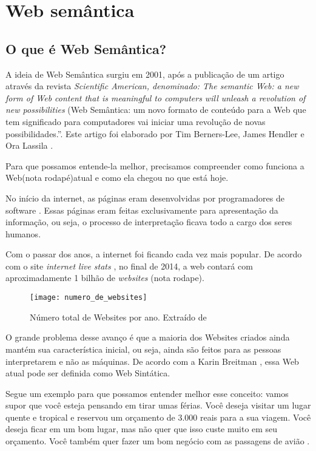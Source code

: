 \chapter{Web semântica}


\section{O que é Web Semântica?}

A ideia de Web Semântica surgiu em 2001, após a publicação de um artigo através da revista \emph{Scientific American, denominado: The semantic Web: a new form of Web content that is meaningful to computers will unleash a revolution of new possibilities} (Web Semântica: um novo formato de conteúdo para a Web que tem significado para computadores vai iniciar uma revolução de novas possibilidades.”. Este artigo foi elaborado por Tim Berners-Lee, James Hendler e Ora Lassila \cite{intwebsem}.

Para que possamos entende-la melhor, precisamos compreender como funciona a Web(nota rodapé)atual e como ela chegou no que está hoje.

No início da internet, as páginas eram desenvolvidas por programadores de software \cite{kbreitman}. Essas páginas eram feitas exclusivamente para apresentação da informação, ou seja, o processo de interpretação ficava todo a cargo dos seres humanos.

Com o passar dos anos, a internet foi ficando cada vez mais popular. De acordo com o site\emph{ internet live stats} \cite{totalwebsite}, no final de 2014, a web contará com aproximadamente 1 bilhão de \emph{websites} (nota rodape).

\graphicspath{{figuras/}}
\begin{figure}[H]
\centering
\texttt{[image: numero\_de\_websites]}
\caption{Número total de Websites por ano. Extraído de \cite{totalwebsite} }
\label{num-website}
\end{figure}

O grande problema desse avanço é que a maioria dos Websites criados ainda mantém sua característica inicial, ou seja, ainda são feitos para as pessoas interpretarem  e não as máquinas. De acordo com a Karin Breitman \cite{kbreitman}, essa Web atual pode ser definida como Web Sintática.

Segue um exemplo para que possamos entender melhor esse conceito: vamos supor que você esteja pensando em tirar umas férias. Você deseja visitar um lugar quente e tropical e reservou um orçamento de 3.000 reais para a sua viagem. Você deseja ficar em um bom lugar, mas não quer que isso custe muito em seu orçamento. Você também quer fazer um bom negócio com as passagens de avião \cite{web3}. 

